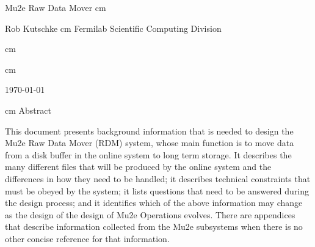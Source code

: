 %
\begin{center}
  {\Huge Mu2e Raw Data Mover}
   cm

  Rob Kutschke
 cm
Fermilab Scientific Computing Division

 cm


%

%

 cm

\today

 cm
Abstract
\end{center}
\medskip

This document presents background information
that is needed to design the Mu2e Raw Data Mover (RDM) system,
whose main function is to move data from a disk buffer
in the online system to long term storage.
It describes the many different files that will be produced by the online system
and the differences in how they need to be handled;
it describes technical constraints that must be obeyed by the system;
it lists questions that need to be answered during the design process;
and it identifies which of the above information may change as the
design of the design of Mu2e Operations evolves.
There are appendices
that describe information collected from the Mu2e subsystems when there
is no other concise reference for that information.
\clearpage
